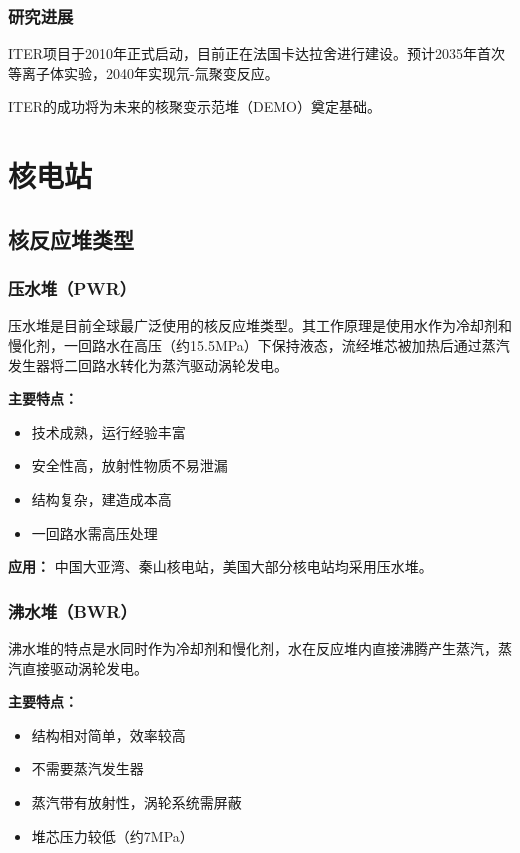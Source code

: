 \documentclass[12pt,UTF8]{ctexbook}
\begin{document}
\section{研究进展}

ITER项目于2010年正式启动，目前正在法国卡达拉舍进行建设。预计2035年首次等离子体实验，2040年实现氘-氚聚变反应。

ITER的成功将为未来的核聚变示范堆（DEMO）奠定基础。

\part{核电站}

\chapter{核反应堆类型}

\section{压水堆（PWR）}

压水堆是目前全球最广泛使用的核反应堆类型。其工作原理是使用水作为冷却剂和慢化剂，一回路水在高压（约15.5MPa）下保持液态，流经堆芯被加热后通过蒸汽发生器将二回路水转化为蒸汽驱动涡轮发电。

\textbf{主要特点：}
\begin{itemize}[leftmargin=2cm]
    \item 技术成熟，运行经验丰富
    \item 安全性高，放射性物质不易泄漏
    \item 结构复杂，建造成本高
    \item 一回路水需高压处理
\end{itemize}

\textbf{应用：} 中国大亚湾、秦山核电站，美国大部分核电站均采用压水堆。

\section{沸水堆（BWR）}

沸水堆的特点是水同时作为冷却剂和慢化剂，水在反应堆内直接沸腾产生蒸汽，蒸汽直接驱动涡轮发电。

\textbf{主要特点：}
\begin{itemize}[leftmargin=2cm]
    \item 结构相对简单，效率较高
    \item 不需要蒸汽发生器
    \item 蒸汽带有放射性，涡轮系统需屏蔽
    \item 堆芯压力较低（约7MPa）
\end{itemize}
\end{document}
